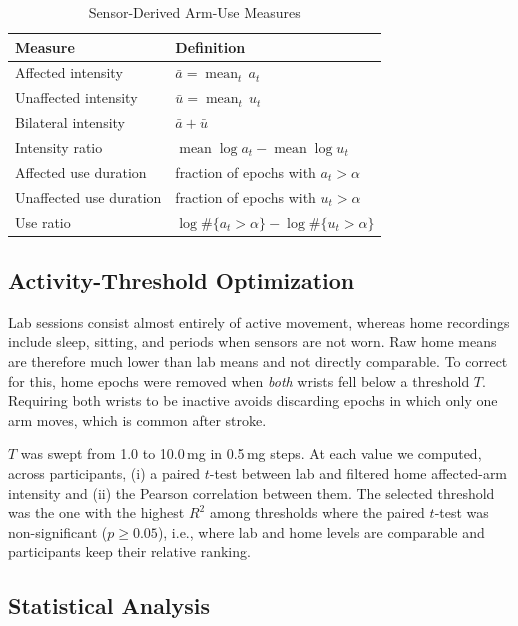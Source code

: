 \documentclass[conference]{IEEEtran}
\begin{document}
\begin{table}[t]
\caption{Sensor-Derived Arm-Use Measures}
\label{tab:measures}
\centering
\footnotesize
\begin{tabular}{@{}ll@{}}
\toprule
Measure & Definition \\
\midrule
Affected intensity & $\bar{a} = \operatorname{mean}_t\, a_t$ \\
Unaffected intensity & $\bar{u} = \operatorname{mean}_t\, u_t$ \\
Bilateral intensity & $\bar{a} + \bar{u}$ \\
Intensity ratio & $\operatorname{mean}\log a_t - \operatorname{mean}\log u_t$ \\
Affected use duration & fraction of epochs with $a_t > \alpha$ \\
Unaffected use duration & fraction of epochs with $u_t > \alpha$ \\
Use ratio & $\log \#\{a_t>\alpha\} - \log \#\{u_t>\alpha\}$ \\
\bottomrule
\end{tabular}
\end{table}

\subsection{Activity-Threshold Optimization}

Lab sessions consist almost entirely of active movement, whereas home recordings
include sleep, sitting, and periods when sensors are not worn. Raw home means are
therefore much lower than lab means and not directly comparable. To correct for
this, home epochs were removed when \emph{both} wrists fell below a threshold $T$.
Requiring both wrists to be inactive avoids discarding epochs in which only one
arm moves, which is common after stroke.

$T$ was swept from 1.0 to 10.0\,mg in 0.5\,mg steps. At each value we computed, across
participants, (i) a paired $t$-test between lab and filtered home affected-arm
intensity and (ii) the Pearson correlation between them. The selected threshold
was the one with the highest $R^2$ among thresholds where the paired $t$-test was
non-significant ($p \ge 0.05$), i.e., where lab and home levels are comparable and
participants keep their relative ranking.

\subsection{Statistical Analysis}
\end{document}
